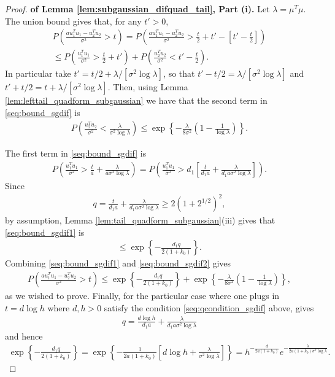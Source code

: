 \begin{proof} {\bf of Lemma \ref{lem:subgaussian_difquad_tail}, Part (i).}
Let $\lambda= \mu^T\mu$.
The union bound gives that, for any $t'>0$,
\begin{align}
  P\left( \frac{a u_1^Tu_1 - u_2^Tu_2}{\sigma^2} > t \right) =
 P\left( \frac{a u_1^Tu_1 - u_2^Tu_2}{\sigma^2} > \frac{t}{2} + t' - \left[t' - \frac{t}{2}\right] \right) 
\nonumber \\
\leq
P \left( \frac{u_1^T u_1}{\sigma^2} > \frac{t}{2} + t' \right) + P \left( \frac{u_2^Tu_2}{\sigma^2} < t' - \frac{t}{2} \right).
\label{seq:bound_sgdif}
\end{align}
In particular take $t'=t/2 + \lambda/[\sigma^2 \log \lambda]$, so that $t'-t/2= \lambda/[\sigma^2 \log \lambda]$ and $t'+t/2= t + \lambda/[\sigma^2 \log \lambda]$.
Then, using Lemma \ref{lem:lefttail_quadform_subgaussian} we have that the second term in \eqref{seq:bound_sgdif} is
\begin{align}
 P \left( \frac{u_2^T u_2}{\sigma^2} < \frac{\lambda}{\sigma^2 \log \lambda}  \right) \leq \exp \left\{ - \frac{\lambda}{8\sigma^2} \left( 1 - \frac{1}{\log \lambda} \right) \right\}.
\label{seq:bound_sgdif2}
\end{align}

The first term in \eqref{seq:bound_sgdif} is
\begin{align}
 P \left( \frac{u_1^Tu_1}{\sigma^2} > \frac{t}{a} + \frac{\lambda}{a \sigma^2 \log \lambda}  \right)=
P \left( \frac{u_1^Tu_1}{\sigma^2} > d_1 \left[ \frac{t}{d_1 a} + \frac{\lambda}{d_1 a \sigma^2 \log \lambda} \right]  \right).
\label{seq:bound_sgdif1}
\end{align}
Since
\begin{align}
 q= \frac{t}{d_1 a} + \frac{\lambda}{d_1 a \sigma^2 \log \lambda} \geq 2(1+2^{1/2})^2,
\label{seq:qcondition_sgdif}
\end{align}
by assumption, Lemma \ref{lem:tail_quadform_subgaussian}(iii) gives that \eqref{seq:bound_sgdif1} is
\begin{align}
 \leq \exp \left\{ - \frac{d_1 q }{2(1+k_0)}\right\}.
\nonumber
\end{align}
Combining \eqref{seq:bound_sgdif1} and \eqref{seq:bound_sgdif2} gives
\begin{align}
  P\left( \frac{a u_1^Tu_1 - u_2^Tu_2}{\sigma^2} > t \right) \leq 
 \exp \left\{ - \frac{d_1 q }{2(1+k_0)}\right\} + \exp \left\{ - \frac{\lambda}{8\sigma^2} \left( 1 - \frac{1}{\log \lambda} \right) \right\},
\nonumber
\end{align}
as we wished to prove.
Finally, for the particular case where one plugs in $t= d \log h$ where $d,h>0$ satisfy the condition \eqref{seq:qcondition_sgdif} above, gives
\begin{align}
 q= \frac{d \log h}{d_1 a} + \frac{\lambda}{d_1 a \sigma^2 \log \lambda}
\nonumber
\end{align}
and hence
\begin{align}
 \exp \left\{ - \frac{d_1 q }{2(1+k_0)}\right\}=
 \exp \left\{ - \frac{1}{2a(1+k_0)} \left[ d \log h + \frac{\lambda}{\sigma^2 \log \lambda} \right]\right\}=
 h^{-\frac{d}{2a(1+k_0)}} e^{-\frac{\lambda}{2a (1+k_0) \sigma^2 \log \lambda}}.
\nonumber
\end{align}



\end{proof}
